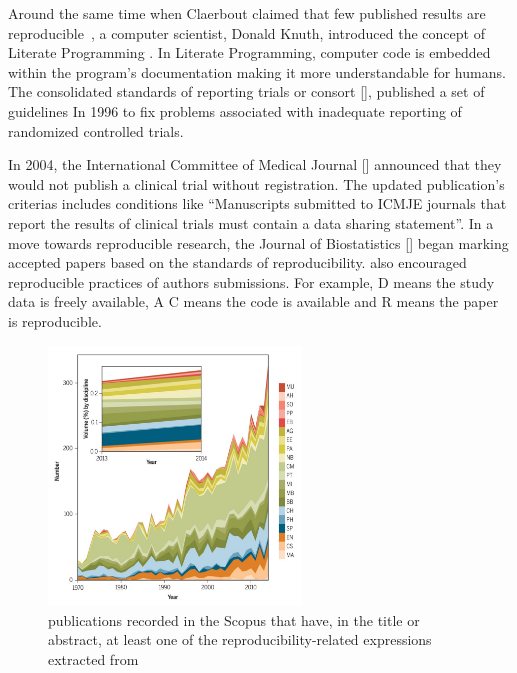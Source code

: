 Around the same time when Claerbout claimed that few published results are reproducible~\cite{claerbout_earth_1992}, 
a computer scientist, Donald Knuth, introduced 
the concept of Literate Programming \cite{knuth_literate_1984}. In Literate Programming, computer code is embedded within 
the program's documentation making it more understandable for humans. The consolidated standards of reporting trials 
or consort [], published a set of guidelines In 1996 to fix problems associated 
with inadequate reporting of randomized controlled trials.

In 2004, the International Committee of Medical Journal [] announced that they would not publish a 
clinical trial without registration. The updated publication's criterias includes conditions like 
“Manuscripts submitted to ICMJE journals that report the results of clinical trials must contain a data sharing statement”. 
In a move towards reproducible research, the Journal of Biostatistics [] began 
marking accepted papers based on the standards of reproducibility. also encouraged reproducible practices of authors 
submissions. For example, D means the study data is freely available, A C means the code is available and R means the 
paper is reproducible. 

\begin{figure}[ht]
    \centering
    \includegraphics[width=0.60\textwidth]{figures/03ReproducibilityPubTimeline.jpg}
    \caption{ publications recorded in the Scopus that have, in the title or abstract, 
    at least one of the reproducibility-related expressions extracted from~\cite{goodman_what_2016}}
    \label{fig:publications}
\end{figure}

